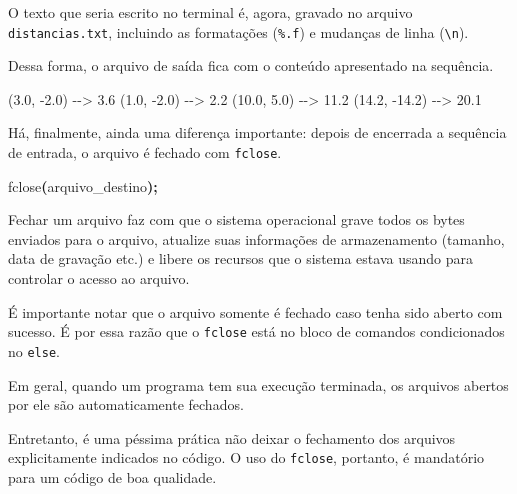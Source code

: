 \documentclass[
  11pt,
  a4paper,
]{scrbook}
\newenvironment{Shaded}{\begin{snugshade}}{\end{snugshade}}
\newcommand{\NormalTok}[1]{#1}
\newcommand{\OperatorTok}[1]{\textcolor[rgb]{0.81,0.36,0.00}{\textbf{#1}}}
\begin{document}
O texto que seria escrito no terminal é, agora, gravado no arquivo
\texttt{distancias.txt}, incluindo as formatações (\texttt{\%.f}) e
mudanças de linha (\texttt{\textbackslash{}n}).

Dessa forma, o arquivo de saída fica com o conteúdo apresentado na
sequência.

\begin{Shaded}
\begin{Highlighting}[]
\NormalTok{(3.0, {-}2.0) {-}{-}\textgreater{} 3.6}
\NormalTok{(1.0, {-}2.0) {-}{-}\textgreater{} 2.2}
\NormalTok{(10.0, 5.0) {-}{-}\textgreater{} 11.2}
\NormalTok{(14.2, {-}14.2) {-}{-}\textgreater{} 20.1}
\end{Highlighting}
\end{Shaded}

Há, finalmente, ainda uma diferença importante: depois de encerrada a
sequência de entrada, o arquivo é fechado com \texttt{fclose}.

\begin{Shaded}
\begin{Highlighting}[]
\NormalTok{fclose}\OperatorTok{(}\NormalTok{arquivo\_destino}\OperatorTok{);}
\end{Highlighting}
\end{Shaded}

Fechar um arquivo faz com que o sistema operacional grave todos os bytes
enviados para o arquivo, atualize suas informações de armazenamento
(tamanho, data de gravação etc.) e libere os recursos que o sistema
estava usando para controlar o acesso ao arquivo.

É importante notar que o arquivo somente é fechado caso tenha sido
aberto com sucesso. É por essa razão que o \texttt{fclose} está no bloco
de comandos condicionados no \texttt{else}.

\begin{tcolorbox}[enhanced jigsaw, arc=.35mm, bottomtitle=1mm, colbacktitle=quarto-callout-tip-color!10!white, title=\textcolor{quarto-callout-tip-color}{\faLightbulb}\hspace{0.5em}{Dica}, toprule=.15mm, left=2mm, opacityback=0, colback=white, colframe=quarto-callout-tip-color-frame, opacitybacktitle=0.6, bottomrule=.15mm, leftrule=.75mm, toptitle=1mm, coltitle=black, titlerule=0mm, rightrule=.15mm, breakable]

Em geral, quando um programa tem sua execução terminada, os arquivos
abertos por ele são automaticamente fechados.

Entretanto, é uma péssima prática não deixar o fechamento dos arquivos
explicitamente indicados no código. O uso do \texttt{fclose}, portanto,
é mandatório para um código de boa qualidade.

\end{tcolorbox}
\end{document}
